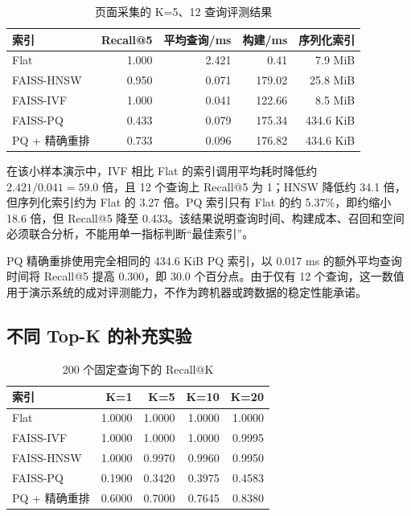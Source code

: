 \documentclass[11pt,a4paper]{article}
\begin{document}
\begin{table}[htbp]
  \centering
  \caption{页面采集的 K=5、12 查询评测结果}
  \label{tab:k5-results}
  \begin{tabular}{lrrrr}
    \toprule
    索引 & Recall@5 & 平均查询/ms & 构建/ms & 序列化索引 \\
    \midrule
    Flat & 1.000 & 2.421 & 0.41 & 7.9 MiB \\
    FAISS-HNSW & 0.950 & 0.071 & 179.02 & 25.8 MiB \\
    FAISS-IVF & 1.000 & 0.041 & 122.66 & 8.5 MiB \\
    FAISS-PQ & 0.433 & 0.079 & 175.34 & 434.6 KiB \\
    PQ + 精确重排 & 0.733 & 0.096 & 176.82 & 434.6 KiB \\
    \bottomrule
  \end{tabular}
\end{table}

在该小样本演示中，IVF 相比 Flat 的索引调用平均耗时降低约 $2.421/0.041=59.0$ 倍，且 12 个查询上 Recall@5 为 1；HNSW 降低约 34.1 倍，但序列化索引约为 Flat 的 3.27 倍。PQ 索引只有 Flat 的约 5.37\%，即约缩小 18.6 倍，但 Recall@5 降至 0.433。该结果说明查询时间、构建成本、召回和空间必须联合分析，不能用单一指标判断“最佳索引”。

PQ 精确重排使用完全相同的 434.6 KiB PQ 索引，以 0.017 ms 的额外平均查询时间将 Recall@5 提高 0.300，即 30.0 个百分点。由于仅有 12 个查询，这一数值用于演示系统的成对评测能力，不作为跨机器或跨数据的稳定性能承诺。

\subsection{不同 Top-K 的补充实验}

\begin{table}[htbp]
  \centering
  \caption{200 个固定查询下的 Recall@K}
  \label{tab:multik-recall}
  \begin{tabular}{lrrrr}
    \toprule
    索引 & K=1 & K=5 & K=10 & K=20 \\
    \midrule
    Flat & 1.0000 & 1.0000 & 1.0000 & 1.0000 \\
    FAISS-IVF & 1.0000 & 1.0000 & 1.0000 & 0.9995 \\
    FAISS-HNSW & 1.0000 & 0.9970 & 0.9960 & 0.9950 \\
    FAISS-PQ & 0.1900 & 0.3420 & 0.3975 & 0.4583 \\
    PQ + 精确重排 & 0.6000 & 0.7000 & 0.7645 & 0.8380 \\
    \bottomrule
  \end{tabular}
\end{table}
\end{document}
